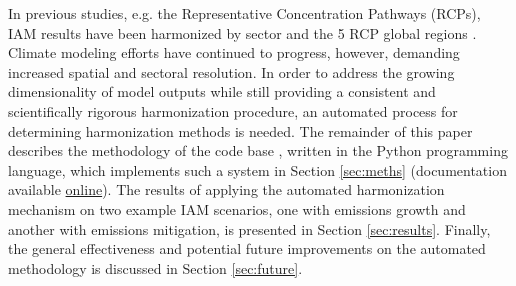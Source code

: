 In previous studies, e.g. the Representative Concentration Pathways (RCPs), IAM
results have been harmonized by sector and the 5 RCP global regions
\cite{vuuren_representative_2011}. Climate modeling efforts have continued to
progress, however, demanding increased spatial and sectoral resolution. In order
to address the growing dimensionality of model outputs while still providing a
consistent and scientifically rigorous harmonization procedure, an automated
process for determining harmonization methods is needed. The remainder of this
paper describes the methodology of the  code base
\cite{matthew_gidden_2017_802832}, written in the Python programming language,
which implements such a system in Section \ref{sec:meths} (documentation
available \href{http://mattgidden.com/aneris/}{online}). The results of applying
the automated harmonization mechanism on two example IAM scenarios, one with
emissions growth and another with emissions mitigation, is presented in Section
\ref{sec:results}. Finally, the general effectiveness and potential future
improvements on the automated methodology is discussed in Section
\ref{sec:future}.

